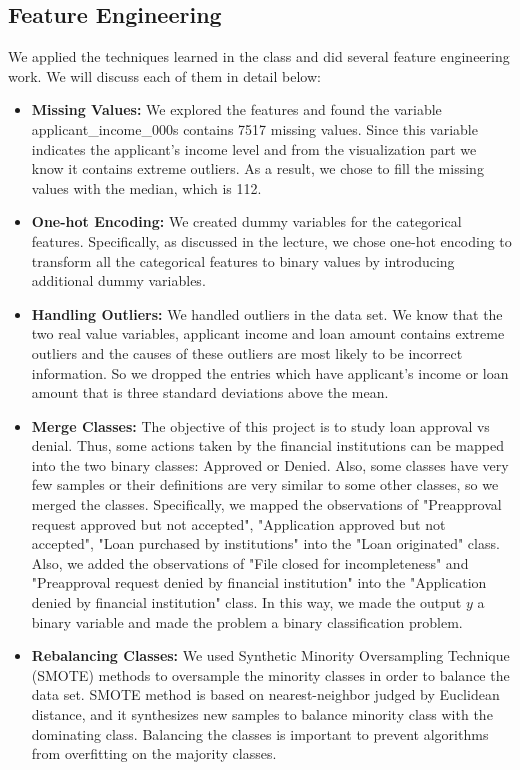 \documentclass[letterpaper, 10 pt, conference]{ieeeconf}  %
\begin{document}
\subsection{Feature Engineering}
We applied the techniques learned in the class and did several feature engineering work. We will discuss each of them in detail below: 
\begin{itemize}
    \item \textbf{Missing Values:} We explored the features and found the variable applicant\_income\_000s contains 7517 missing values. Since this variable indicates the applicant's income level and from the visualization part we know it contains extreme outliers. As a result, we chose to fill the missing values with the median, which is 112.
    \item \textbf{One-hot Encoding:} We created dummy variables for the categorical features. Specifically, as discussed in the lecture, we chose one-hot encoding to transform all the categorical features to binary values by introducing additional dummy variables.
    \item \textbf{Handling Outliers:} We handled outliers in the data set. We know that the two real value variables, applicant income and loan amount contains extreme outliers and the causes of these outliers are most likely to be incorrect information. So we dropped the entries which have applicant's income or loan amount that is three standard deviations above the mean.
    \item \textbf{Merge Classes:} The objective of this project is to study loan approval vs denial. Thus, some actions taken by the financial institutions can be mapped into the two binary classes: Approved or Denied. Also, some classes have very few samples or their definitions are very similar to some other classes, so we merged the classes. Specifically, we mapped the observations of "Preapproval request approved but not accepted", "Application approved but not accepted", "Loan purchased by institutions" into the "Loan originated" class. Also, we added the observations of "File closed for incompleteness" and "Preapproval request denied by financial institution" into the "Application denied by financial institution" class. In this way, we made the output $y$ a binary variable and made the problem a binary classification problem.
    \item \textbf{Rebalancing Classes:} We used Synthetic Minority Oversampling Technique (SMOTE)\cite{c2} methods to oversample the minority classes in order to balance the data set. SMOTE method is based on nearest-neighbor judged by Euclidean distance, and it synthesizes new samples to balance minority class with the dominating class. Balancing the classes is important to prevent algorithms from overfitting on the majority classes.

\end{itemize}
\end{document}
